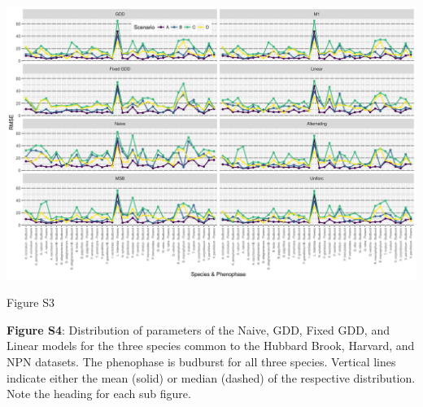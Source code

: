 \documentclass[a4paper,12pt]{article}
\begin{document}
\begin{center}
	\centering
		\includegraphics[width=1\textwidth]{supplement_scenario_absolute_rmse.png}
	\caption{Figure S3}
\end{center}

\newpage

\textbf{Figure S4}: Distribution of parameters of the Naive, GDD, Fixed GDD, and Linear models for the three species common to the Hubbard Brook, Harvard, and NPN datasets. The phenophase is budburst for all three species. Vertical lines indicate either the mean (solid) or median (dashed) of the respective distribution. Note the heading for each sub figure. 

\newpage
\end{document}
